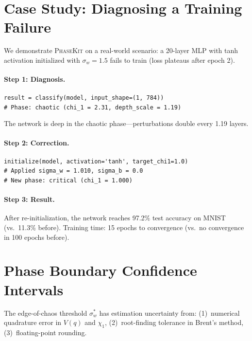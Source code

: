\documentclass[10pt]{article}
\newcommand{\ToolName}{\textsc{PhaseKit}}
\begin{document}
\section{Case Study: Diagnosing a Training Failure}
\label{app:case-study}

We demonstrate \ToolName{} on a real-world scenario: a 20-layer MLP with tanh activation initialized with $\sigma_w = 1.5$ fails to train (loss plateaus after epoch 2).

\paragraph{Step 1: Diagnosis.}
\begin{verbatim}
result = classify(model, input_shape=(1, 784))
# Phase: chaotic (chi_1 = 2.31, depth_scale = 1.19)
\end{verbatim}
The network is deep in the chaotic phase---perturbations double every 1.19 layers.

\paragraph{Step 2: Correction.}
\begin{verbatim}
initialize(model, activation='tanh', target_chi1=1.0)
# Applied sigma_w = 1.010, sigma_b = 0.0
# New phase: critical (chi_1 = 1.000)
\end{verbatim}

\paragraph{Step 3: Result.}
After re-initialization, the network reaches 97.2\% test accuracy on MNIST (vs.\ 11.3\% before).
Training time: 15 epochs to convergence (vs.\ no convergence in 100 epochs before).

\section{Phase Boundary Confidence Intervals}
\label{app:phase-boundary}

The edge-of-chaos threshold $\sigma_w^*$ has estimation uncertainty from:
(1)~numerical quadrature error in $V(q)$ and $\chi_1$,
(2)~root-finding tolerance in Brent's method,
(3)~floating-point rounding.
\end{document}
